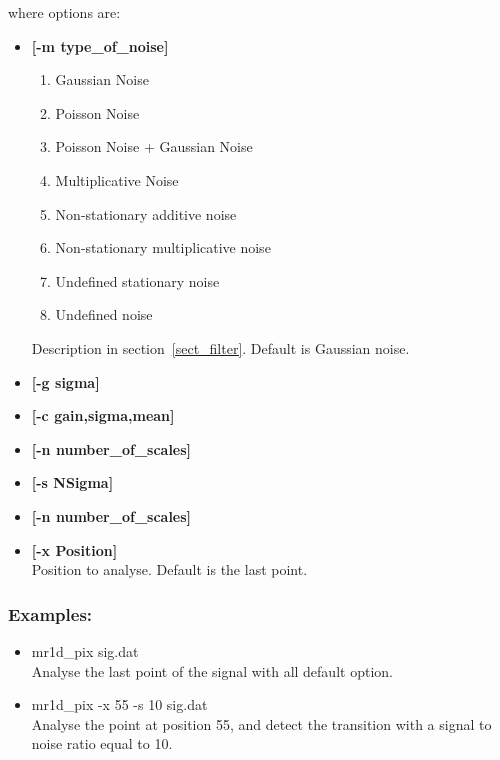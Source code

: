 where options are:
\begin{itemize}
\item {\bf [-m type\_of\_noise]}
{\small
\begin{enumerate}
\baselineskip=0.4truecm
\item Gaussian Noise 
\item Poisson Noise 
\item Poisson Noise + Gaussian Noise 
\item Multiplicative Noise 
\item Non-stationary additive noise 
\item Non-stationary multiplicative noise 
\item Undefined stationary noise 
\item Undefined noise 
\end{enumerate}
}
Description in section~\ref{sect_filter}. Default is Gaussian noise.
\item {\bf [-g sigma]} 
\item {\bf [-c gain,sigma,mean]} 
\item {\bf [-n number\_of\_scales]} 
\item {\bf [-s NSigma]} 
\item {\bf [-n number\_of\_scales]} 
\item {\bf [-x Position]}  \\
Position to analyse. Default is the last point.
\end{itemize}
\subsubsection*{Examples:}
\begin{itemize}
\item mr1d\_pix sig.dat  \\
Analyse the last point of the signal with all default option.
\item mr1d\_pix -x 55 -s 10 sig.dat  \\
Analyse the point at position 55, and detect the transition with a 
signal to noise ratio equal to 10.
\end{itemize}


